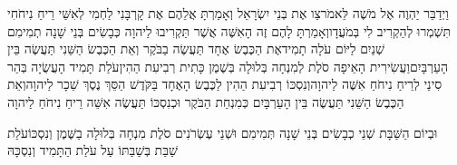 \documentclass[../main/main.tex]{subfiles}
\begin{document}
\begin{multicols*}{\ncols}
וַיְדַבֵּר יַהְוֶה אֶל מֹשֶׁה לֵּאמֹר\PreVerseSpace{}צַו אֶת בְּנֵי יִשְׂרָאֵל וְאָמַרְתָּ אֲלֵהֶם אֶת קָרְבָּנִי לַחְמִי לְאִשַּׁי רֵיחַ נִיחֹחִי תִּשְׁמְרוּ לְהַקְרִיב לִי בְּמֹעֲדָו\SubEnd{}\PreVerseSpace{}וְאָמַרְתָּ לָהֶם זֶה הָאִשֶּׁה אֲשֶׁר תַּקְרִיבוּ לַיהוָה כְּבָשִׂים בְּנֵי שָׁנָה תְמִימִם שְׁנַיִם לַיּוֹם עֹלָה תָמִיד\PreVerseSpace{}אֶת הַכֶּבֶשׂ אֶחָד תַּעֲשֶׂה בַבֹּקֶר וְאֵת הַכֶּבֶשׂ הַשֵּׁנִי תַּעֲשֶׂה בֵּין הָעַרְבָּיִם\PreVerseSpace{}וַעֲשִׂירִית הָאֵיפָה סֹלֶת לְמִנְחָה בְּלוּלָה בְּשֶׁמֶן כָּתִית רְבִיעִת הַהִין\PreVerseSpace{}עֹלַת תָּמִיד הָעֲשֻׂיָה בְּהַר סִינַי לְרֵיחַ נִיחֹחַ אִשֶּׁה לַיהוָה\PreVerseSpace{}וְנִסְכּוֹ רְבִיעִת הַהִין לַכֶּבֶשׂ הָאֶחָד בַּקֹּדֶשׁ הַסֵּךְ נֶסֶךְ שֵׁכָר לַיהוָה\PreVerseSpace{}וְאֵת הַכֶּבֶשׂ הַשֵּׁנִי תַּעֲשֶׂה בֵּין הָעַרְבָּיִם כְּמִנְחַת הַבֹּקֶר וּכְנִסְכּוֹ תַּעֲשֶׂה אִשֵּׁה רֵיחַ נִיחֹחַ לַיהוָה\OpenSection{}\par
{}וּבְיוֹם הַשַּׁבָּת שְׁנֵי כְבָשִׂים בְּנֵי שָׁנָה תְּמִימִם וּשְׁנֵי עֶשְׂרֹנִים סֹלֶת מִנְחָה בְּלוּלָה בַשֶּׁמֶן וְנִסְכּוֹ\PreVerseSpace{}עֹלַת שַׁבַּת בְּשַׁבַּתּוֹ עַל עֹלַת הַתָּמִיד וְנִסְכָּהּ\OpenSection{}\par

\end{multicols*}
\end{document}
